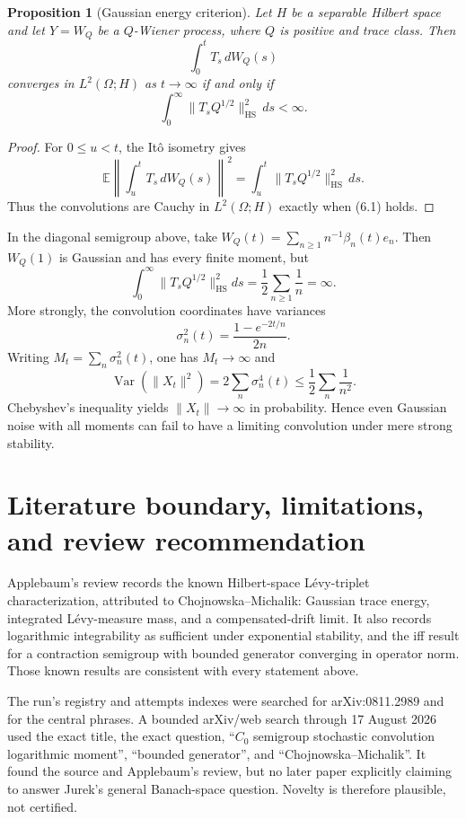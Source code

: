 \documentclass[11pt]{article}
\newtheorem{proposition}[theorem]{Proposition}
\theoremstyle{remark}
\newcommand{\E}{\mathbb E}
\newcommand{\HS}{\operatorname{HS}}
\begin{document}
\begin{proposition}[Gaussian energy criterion]\label{prop:gauss}
Let $H$ be a separable Hilbert space and let $Y=W_Q$ be a $Q$-Wiener process,
where $Q$ is positive and trace class.  Then
\[
 \int_0^tT_s\,dW_Q(s)
\]
converges in $L^2(\Omega;H)$ as $t\to\infty$ if and only if
\[
 \int_0^\infty\|T_sQ^{1/2}\|_{\HS}^2\,ds<\infty.   \tag{6.1}
\]
\end{proposition}

\begin{proof}
For $0\leq u<t$, the It\^o isometry gives
\[
 \E\left\|\int_u^tT_s\,dW_Q(s)\right\|^2
 =\int_u^t\|T_sQ^{1/2}\|_{\HS}^2\,ds.
\]
Thus the convolutions are Cauchy in $L^2(\Omega;H)$ exactly when (6.1)
holds.
\end{proof}

In the diagonal semigroup above, take
$W_Q(t)=\sum_{n\geq1}n^{-1}\beta_n(t)e_n$.  Then $W_Q(1)$ is Gaussian and
has every finite moment, but
\[
 \int_0^\infty\|T_sQ^{1/2}\|_{\HS}^2ds
 =\frac12\sum_{n\geq1}\frac1n=\infty.
\]
More strongly, the convolution coordinates have variances
\[
 \sigma_n^2(t)=\frac{1-e^{-2t/n}}{2n}.
\]
Writing $M_t=\sum_n\sigma_n^2(t)$, one has $M_t\to\infty$ and
\[
 \operatorname{Var}(\|X_t\|^2)
 =2\sum_n\sigma_n^4(t)
 \leq\frac12\sum_n\frac1{n^2}.
\]
Chebyshev's inequality yields $\|X_t\|\to\infty$ in probability.  Hence even
Gaussian noise with all moments can fail to have a limiting convolution under
mere strong stability.

\section{Literature boundary, limitations, and review recommendation}

Applebaum's review \cite[Theorem 6.3 and Section 6.1]{Applebaum} records the
known Hilbert-space L\'evy-triplet characterization, attributed to
Chojnowska--Michalik: Gaussian trace energy, integrated L\'evy-measure mass,
and a compensated-drift limit.  It also records logarithmic integrability as
sufficient under exponential stability, and the iff result for a contraction
semigroup with bounded generator converging in operator norm.  Those known
results are consistent with every statement above.

The run's registry and attempts indexes were searched for arXiv:0811.2989 and
for the central phrases.  A bounded arXiv/web search through 17 August 2026
used the exact title, the exact question, ``$C_0$ semigroup stochastic
convolution logarithmic moment'', ``bounded generator'', and
``Chojnowska--Michalik''.  It found the source and Applebaum's review, but no
later paper explicitly claiming to answer Jurek's general Banach-space
question.  Novelty is therefore plausible, not certified.
\end{document}
